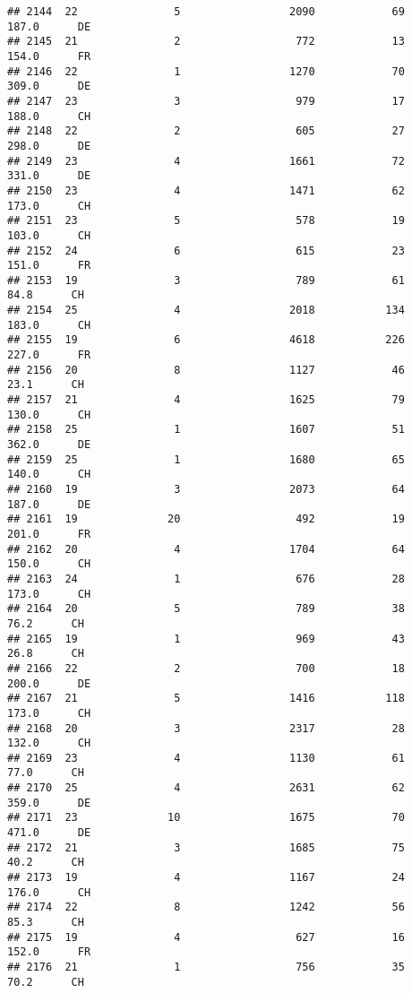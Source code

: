 \documentclass[
]{article}
\begin{document}
\begin{verbatim}
## 2144  22               5                 2090            69    187.0      DE
## 2145  21               2                  772            13    154.0      FR
## 2146  22               1                 1270            70    309.0      DE
## 2147  23               3                  979            17    188.0      CH
## 2148  22               2                  605            27    298.0      DE
## 2149  23               4                 1661            72    331.0      DE
## 2150  23               4                 1471            62    173.0      CH
## 2151  23               5                  578            19    103.0      CH
## 2152  24               6                  615            23    151.0      FR
## 2153  19               3                  789            61     84.8      CH
## 2154  25               4                 2018           134    183.0      CH
## 2155  19               6                 4618           226    227.0      FR
## 2156  20               8                 1127            46     23.1      CH
## 2157  21               4                 1625            79    130.0      CH
## 2158  25               1                 1607            51    362.0      DE
## 2159  25               1                 1680            65    140.0      CH
## 2160  19               3                 2073            64    187.0      DE
## 2161  19              20                  492            19    201.0      FR
## 2162  20               4                 1704            64    150.0      CH
## 2163  24               1                  676            28    173.0      CH
## 2164  20               5                  789            38     76.2      CH
## 2165  19               1                  969            43     26.8      CH
## 2166  22               2                  700            18    200.0      DE
## 2167  21               5                 1416           118    173.0      CH
## 2168  20               3                 2317            28    132.0      CH
## 2169  23               4                 1130            61     77.0      CH
## 2170  25               4                 2631            62    359.0      DE
## 2171  23              10                 1675            70    471.0      DE
## 2172  21               3                 1685            75     40.2      CH
## 2173  19               4                 1167            24    176.0      CH
## 2174  22               8                 1242            56     85.3      CH
## 2175  19               4                  627            16    152.0      FR
## 2176  21               1                  756            35     70.2      CH

\end{verbatim}
\end{document}
